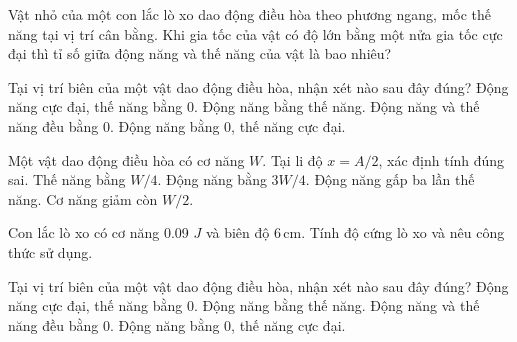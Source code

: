 \begin{ex}
Vật nhỏ của một con lắc lò xo dao động điều hòa theo phương ngang, mốc thế năng tại vị trí cân bằng. Khi gia tốc của vật có độ lớn bằng một nửa gia tốc cực đại thì tỉ số giữa động năng và thế năng của vật là bao nhiêu?
\end{ex}

\begin{ex}
Tại vị trí biên của một vật dao động điều hòa, nhận xét nào sau đây đúng?
\choice
{Động năng cực đại, thế năng bằng 0.}
{Động năng bằng thế năng.}
{Động năng và thế năng đều bằng 0.}
{\True Động năng bằng 0, thế năng cực đại.}
\end{ex}

\begin{ex}
Một vật dao động điều hòa có cơ năng $W$. Tại li độ $x=A/2$, xác định tính đúng sai.
\choiceTF
{\True Thế năng bằng $W/4$.}
{\True Động năng bằng $3W/4$.}
{\True Động năng gấp ba lần thế năng.}
{Cơ năng giảm còn $W/2$.}
\end{ex}

\begin{ex}
Con lắc lò xo có cơ năng 0.09 $J$ và biên độ $6\,\text{cm}$. Tính độ cứng lò xo và nêu công thức sử dụng.
\choiceTF

\end{ex}


\begin{ex}
Tại vị trí biên của một vật dao động điều hòa, nhận xét nào sau đây đúng?
\choice
{Động năng cực đại, thế năng bằng 0.}
{Động năng bằng thế năng.}
{Động năng và thế năng đều bằng 0.}
{\True Động năng bằng 0, thế năng cực đại.}
\end{ex}

